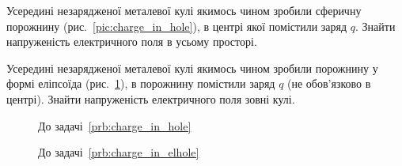 \begin{problem}\label{prb:charge_in_hole}
Усередині незарядженої металевої кулі якимось чином зробили сферичну порожнину (рис.~\ref{pic:charge_in_hole}), в центрі якої помістили
заряд  $q$.
Знайти напруженість електричного поля в усьому просторі.
\end{problem}

\begin{problem}\label{prb:charge_in_elhole}
Усередині незарядженої металевої кулі якимось чином зробили порожнину у формі еліпсоїда (рис.~\ref{pic:charge_in_elhole}), в порожнину помістили
заряд  $q$ (не обов’язково в центрі).
Знайти напруженість електричного поля зовні кулі.
\end{problem}

\begin{figure}[h!]\centering
\begin{minipage}[t]{0.45\linewidth}\centering
		\caption{До задачі~\ref{prb:charge_in_hole}}
		\label{pic:charge_in_hole}
\end{minipage}
\begin{minipage}[t]{0.45\linewidth}\centering
		\caption{До задачі~\ref{prb:charge_in_elhole}}
		\label{pic:charge_in_elhole}
\end{minipage}
\end{figure}





